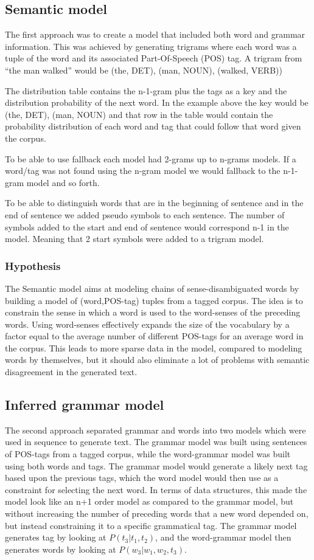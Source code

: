\documentclass[a4paper,12pt]{article}
\begin{document}
\subsection{Semantic model}
The first approach was to create a model that included both word and grammar information. This was achieved by generating trigrams where each word was a tuple of the word and its associated Part-Of-Speech (POS) tag. A trigram from ``the man walked'' would be (the, DET), (man, NOUN), (walked, VERB))

The distribution table contains the n-1-gram plus the tags as a key and the distribution probability of the next word. In the example above the key would be (the, DET), (man, NOUN) and that row in the table would contain the probability distribution of each word and tag that could follow that word given the corpus.

To be able to use fallback each model had 2-grams up to n-grams models. If a word/tag was not found using the n-gram model we would fallback to the n-1-gram model and so forth.

To be able to distinguish words that are in the beginning of sentence and in the end of sentence we added pseudo symbols to each sentence. The number of symbols added to the start and end of sentence would correspond n-1 in the model. Meaning that 2 start symbols were added to a trigram model.

\subsubsection{Hypothesis}
The Semantic model aims at modeling chains of sense-disambiguated words by building a model of (word,POS-tag) tuples from a tagged corpus. The idea is to constrain the sense in which a word is used to the word-senses of the preceding words. Using word-senses effectively expands the size of the vocabulary by a factor equal to the average number of different POS-tags for an average word in the corpus. This leads to more sparse data in the model, compared to modeling words by themselves, but it should also eliminate a lot of problems with semantic disagreement in the generated text.

\subsection{Inferred grammar model}
The second approach separated grammar and words into two models which were used in sequence to generate text. The grammar model was built using sentences of POS-tags from a tagged corpus, while the word-grammar model was built using both words and tags. The grammar model would generate a likely next tag based upon the previous tags, which the word model would then use as a constraint for selecting the next word. In terms of data structures, this made the model look like an n+1 order model as compared to the grammar model, but without increasing the number of preceding words that a new word depended on, but instead constraining it to a specific grammatical tag.
The grammar model generates tag by looking at $P(t_3|t_1,t_2)$, and the word-grammar model then generates words by looking at $P(w_3|w_1,w_2,t_3)$.
\end{document}

